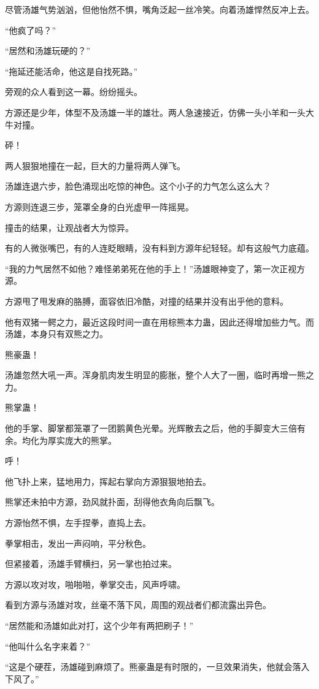 \begin{this_body}
尽管汤雄气势汹汹，但他怡然不惧，嘴角泛起一丝冷笑。向着汤雄悍然反冲上去。

“他疯了吗？”

“居然和汤雄玩硬的？”

“拖延还能活命，他这是自找死路。”

旁观的众人看到这一幕。纷纷摇头。

方源还是少年，体型不及汤雄一半的雄壮。两人急速接近，仿佛一头小羊和一头大牛对撞。

砰！

两人狠狠地撞在一起，巨大的力量将两人弹飞。

汤雄连退六步，脸色涌现出吃惊的神色。这个小子的力气怎么这么大？

方源则连退三步，笼罩全身的白光虚甲一阵摇晃。

撞击的结果，让观战者大为惊异。

有的人微张嘴巴，有的人连眨眼睛，没有料到方源年纪轻轻。却有这般气力底蕴。

“我的力气居然不如他？难怪弟弟死在他的手上！”汤雄眼神变了，第一次正视方源。

方源甩了甩发麻的胳膊，面容依旧冷酷，对撞的结果并没有出乎他的意料。

他有双猪一鳄之力，最近这段时间一直在用棕熊本力蛊，因此还得增加些力气。而汤雄，本身只有双熊之力。

熊豪蛊！

汤雄忽然大吼一声。浑身肌肉发生明显的膨胀，整个人大了一圈，临时再增一熊之力。

熊掌蛊！

他的手掌、脚掌都笼罩了一团鹅黄色光晕。光辉散去之后，他的手脚变大三倍有余。均化为厚实庞大的熊掌。

呼！

他飞扑上来，猛地用力，挥起右掌向方源狠狠地拍去。

熊掌还未拍中方源，劲风就扑面，刮得他衣角向后飘飞。

方源怡然不惧，左手捏拳，直捣上去。

拳掌相击，发出一声闷响，平分秋色。

但紧接着，汤雄手臂横扫，另一掌也拍过来。

方源以攻对攻，啪啪啪，拳掌交击，风声呼啸。

看到方源与汤雄对攻，丝毫不落下风，周围的观战者们都流露出异色。

“居然能和汤雄如此对打，这个少年有两把刷子！”

“他叫什么名字来着？”

“这是个硬茬，汤雄碰到麻烦了。熊豪蛊是有时限的，一旦效果消失，他就会落入下风了。”


\end{this_body}
